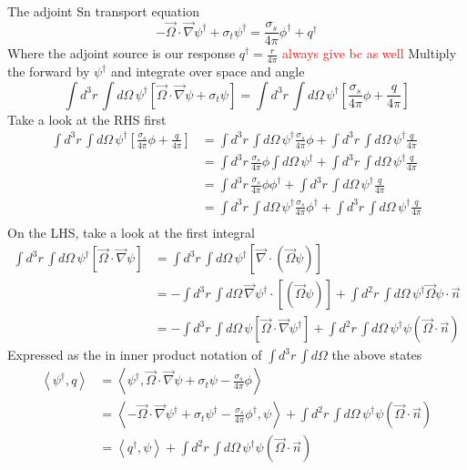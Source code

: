\documentclass{article}
\newcommand{\vO}{\vec{\Omega}}
\newcommand{\bra}{\left\langle}
\newcommand{\ket}{\right\rangle}
\newcommand{\vdiv}{\vec{\nabla} \cdot}
\newcommand{\vgrad}{\vec{\nabla}}
\begin{document}
The adjoint Sn transport equation
\[
- \vO \cdot \vgrad \psi^\dag + \sigma_t \psi^\dag = \frac{\sigma_s}{4 \pi} \phi^\dag + q^\dag
\]
Where the adjoint source is our response $q^\dag = \frac{r}{4 \pi}$
\textcolor{red}{always give bc as well}
Multiply the forward by $\psi^\dag$ and integrate over space and angle
\[
\int d^3 r \, \int d  \Omega \,  \psi^\dag \left[ \vO \cdot \vgrad \psi + \sigma_t \psi  \right] = 
\int d^3 r \, \int d  \Omega \,  \psi^\dag \left[ \frac{\sigma_s}{4 \pi} \phi + \frac{q}{4 \pi}  \right]
\]
Take a look at the RHS first
\begin{align*}
\int d^3 r \, \int d  \Omega \,  \psi^\dag \left[ \frac{\sigma_s}{4 \pi} \phi + \frac{q}{4 \pi}  \right]
&= 
\int d^3 r \, \int d  \Omega \,  \psi^\dag \frac{\sigma_s}{4 \pi} \phi + \int d^3 r \, \int d  \Omega \,  \psi^\dag \frac{q}{4 \pi}  \\
&= 
\int d^3 r \, \frac{\sigma_s}{4 \pi} \phi \int d  \Omega \,  \psi^\dag  + \int d^3 r \, \int d  \Omega \,  \psi^\dag \frac{q}{4 \pi}  \\
&= 
\int d^3 r \, \frac{\sigma_s}{4 \pi} \phi  \phi^\dag  + \int d^3 r \, \int d  \Omega \,  \psi^\dag \frac{q}{4 \pi}  \\
&= 
\int d^3 r \, \int d  \Omega \,  \psi^\dag \frac{\sigma_s}{4 \pi} \phi^\dag + \int d^3 r \, \int d  \Omega \,  \psi^\dag \frac{q}{4 \pi}  \\
\end{align*}
On the LHS, take a look at the first integral
\begin{align*}
\int d^3 r \, \int d  \Omega \,  \psi^\dag \left[  \vO \cdot \vgrad \psi \right]
&= \int d^3 r \, \int d  \Omega \,  \psi^\dag \left[  \vdiv (\vO \psi) \right] \\
&= - \int d^3 r \, \int d  \Omega \,  \vgrad \psi^\dag \cdot \left[(\vO \psi) \right] 
+ \int d^2 r \, \int d  \Omega \, \psi^\dag \vO \psi \cdot \vec{n} \\
&= - \int d^3 r \, \int d  \Omega \,  \psi \left[  \vO \cdot \vgrad \psi^\dag \right] 
+ \int d^2 r \, \int d  \Omega \, \psi^\dag \psi ( \vO \cdot \vec{n})
\end{align*}
Expressed as the in inner product notation of $\int d^3 r \, \int d  \Omega $ the above states
\begin{align*}
\bra \psi^\dag , q \ket &=  \bra \psi^\dag , \vO \cdot \vgrad \psi + \sigma_t \psi - \frac{\sigma_s}{4 \pi} \phi \ket \\
&=  \bra - \vO \cdot \vgrad \psi^\dag + \sigma_t \psi^\dag - \frac{\sigma_s}{4 \pi} \phi^\dag , \psi \ket + \int d^2 r \, \int d  \Omega \, \psi^\dag \psi ( \vO \cdot \vec{n} ) \\
&=  \bra q^\dag , \psi \ket + \int d^2 r \, \int d  \Omega \, \psi^\dag \psi ( \vO \cdot \vec{n} ) \\
\end{align*}
\end{document}

